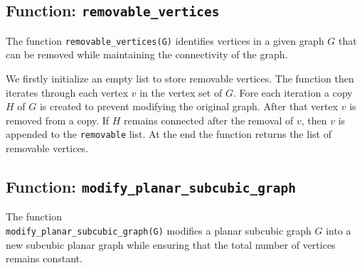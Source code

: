 \documentclass[12pt,a4paper]{amsart}
\theoremstyle{definition}
\theoremstyle{plain}
\begin{document}
\subsection*{Function: \texttt{removable\_vertices}}

The function \texttt{removable\_vertices(G)} identifies vertices in a given graph \( G \) that can be removed while 
maintaining the connectivity of the graph.

We firstly initialize an empty list to store removable vertices. The function then iterates through each vertex \( v \) 
in the vertex set of \( G \). Fore each iteration a copy \( H \) of \( G \) is created to prevent modifying the original
graph. After that vertex \( v \) is removed from a copy. If \( H \) remains connected after the removal of \( v \), then 
\( v \) is appended to the \texttt{removable} list. At the end the function returns the list of removable vertices.


\subsection*{Function: \texttt{modify\_planar\_subcubic\_graph}} 

The function \\
\texttt{modify\_planar\_subcubic\_graph(G)} modifies a planar subcubic graph \( G \) into a new subcubic 
planar graph while ensuring that the total number of vertices remains constant.
\end{document}
